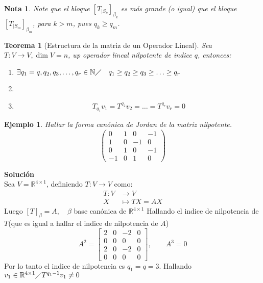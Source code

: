 \documentclass[10pt,a4paper]{article}
\newtheorem{mynote}{Nota}
\newtheorem{mytheo}{Teorema}
\newtheorem{myexamp}{Ejemplo}
\begin{document}
\begin{mynote}
Note que el bloque $\left[T_{|S_{k}}\right]_{\beta_{k}}$ es más grande (o igual) que el bloque $\left[T_{|S_{m}}\right]_{\beta_{m}}$, para $k > m$, pues $q_{k}\geq q_{m}$.

\end{mynote}


\begin{mytheo}[Estructura de la matriz de un Operador Lineal]
Sea $T:V\rightarrow V, \dim V = n$, up operador lineal nilpotente de indice $q$, entonces:
\begin{enumerate}
	\item $\exists q_{1} = q, q_{2}, q_{3},\ldots, q_{r}\in\mathbb{N}\diagup\quad q_{1}\geq q_{2}\geq q_{3}\geq\ldots\geq q_{r}$
	\item 
	\item
	$$T_{q_{1}} v_{1} = T^{q_{2}}v_{2} = \ldots = T^{q_{r}}v_{r} = 0$$
\end{enumerate}
\end{mytheo}

\begin{myexamp}
	Hallar la forma canónica de Jordan de la matriz nilpotente.
	$$\begin{pmatrix}
		0	&	1	&	0	&	-1\\
		1	&	0	&	-1	&	0\\
		0	&	1	&	0	&	-1\\
		-1	&	0	&	1	&	0
	\end{pmatrix}$$
\end{myexamp}
\textbf{Solución}\\
Sea $V = \mathbb{R}^{4\times 1}$, definiendo $T:V\rightarrow V$ como:
\begin{align*}
	T: V &\rightarrow V\\
	X &\mapsto TX = AX
\end{align*}
Luego $[T]_{\beta} = A, \quad\beta$ base canónica de $\mathbb{R}^{4\times 1}$
Hallando el indice de nilpotencia de $T$(que es igual a hallar el indice de nilpotencia de $A$)
$$A^{2} = 
\begin{bmatrix}
2	&	0	&	-2	&	0\\
0	&	0	&	0	&	0\\
2	&	0	&	-2	&	0\\
0	&	0	&	0	&	0
\end{bmatrix},\qquad
A^{3} = 0
$$
Por lo tanto el indice de nilpotencia es $q_{1} = q = 3$.
Hallando $v_{1}\in\mathbb{R}^{4\times 1}\diagup T^{q_{1}-1}v_{1}\neq 0$
\end{document}
